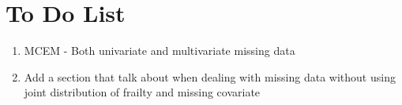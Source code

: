 \documentclass[preprint,12pt]{elsarticle}
\begin{document}
\begin{frontmatter}





\end{frontmatter}

\linenumbers
\section{To Do List}
\begin{enumerate}
    \item MCEM - Both univariate and multivariate missing data
    \item Add a section that talk about when dealing with missing data without using joint distribution of frailty and missing covariate
\end{enumerate}
\end{document}
